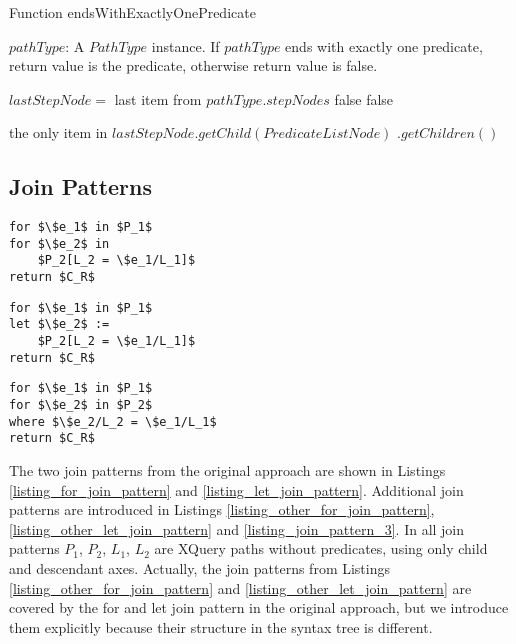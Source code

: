 \begin{algorithm}
\caption{Function endsWithExactlyOnePredicate}
\label{ALG_function_ends_with_exactly_one_predicate}
\begin{algorithmic}[1]
\REQUIRE $pathType$: A $PathType$ instance.
\ENSURE If $pathType$ ends with exactly one predicate, return value is the predicate, otherwise return value is false.

\STATE $lastStepNode =$ last item from $pathType.stepNodes$
	\RETURN false
\ENDIF
{}
	\RETURN false
\ENDIF

\RETURN the only item in $lastStepNode.getChild(PredicateListNode)$ $.getChildren()$
\end{algorithmic}
\end{algorithm}

\subsection{Join Patterns}

\begin{lstlisting}[mathescape, float, caption=Other form of the for join pattern., frame=single, label=listing_other_for_join_pattern]
for $\$e_1$ in $P_1$
for $\$e_2$ in
    $P_2[L_2 = \$e_1/L_1]$
return $C_R$
\end{lstlisting}

\begin{lstlisting}[mathescape, float, caption=Other form of the let join pattern., frame=single, label=listing_other_let_join_pattern]
for $\$e_1$ in $P_1$
let $\$e_2$ :=
    $P_2[L_2 = \$e_1/L_1]$
return $C_R$
\end{lstlisting}

\begin{lstlisting}[mathescape, float, caption=Join pattern 3., frame=single, label=listing_join_pattern_3]
for $\$e_1$ in $P_1$
for $\$e_2$ in $P_2$
where $\$e_2/L_2 = \$e_1/L_1$
return $C_R$
\end{lstlisting}

The two join patterns from the original approach are shown in Listings \ref{listing_for_join_pattern} and \ref{listing_let_join_pattern}. Additional join patterns are introduced in Listings \ref{listing_other_for_join_pattern}, \ref{listing_other_let_join_pattern} and \ref{listing_join_pattern_3}. In all join patterns $P_1$, $P_2$, $L_1$, $L_2$ are XQuery paths without predicates, using only child and descendant axes. Actually, the join patterns from Listings \ref{listing_other_for_join_pattern} and \ref{listing_other_let_join_pattern} are covered by the for and let join pattern in the original approach, but we introduce them explicitly because their structure in the syntax tree is different.

